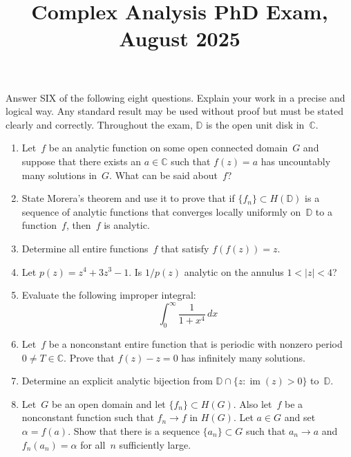 \documentclass[11pt,letterpaper]{article}
\title{Complex Analysis PhD Exam, August 2025}
\author{}
\date{}
\newenvironment{examproblems}[2]{%
  \def\ProblemHeadingTag{#2}%
  \AssignTaggingSocketPlug{block/list/label}{examproblem}%
  \begin{enumerate}%
  \setcounter{enumi}{#1}%
  \renewcommand{\labelenumi}{\textbf{\theenumi.}}%
  \setlength{\topsep}{0.35em}%
  \setlength{\partopsep}{0pt}%
  \setlength{\itemsep}{0.48em}%
  \setlength{\parsep}{0.18em}%
}{\end{enumerate}}
\newenvironment{examinstructions}{%
  \par\begingroup\itshape
}{%
  \par\endgroup\vspace{0.18em}
}
\begin{document}
\maketitle
\thispagestyle{empty}
\begin{examinstructions}
Answer SIX of the following eight questions. Explain your work in a precise and logical way. Any standard result may be used without proof but must be stated clearly and correctly. Throughout the exam, \(\mathbb{D}\) is the open unit disk in~\(\mathbb{C}\).
\end{examinstructions}
\begin{examproblems}{0}{H2}
\def\ProblemHeadingText{Problem 1.}
\item
Let~\(f\) be an analytic function on some open connected domain~\(G\) and suppose that there exists an \(a\in\mathbb{C}\) such that \(f(z)=a\) has uncountably many solutions in~\(G\). What can be said about~\(f\)?
\def\ProblemHeadingText{Problem 2.}
\item
State Morera’s theorem and use it to prove that if \(\{f_n\}\subset H(\mathbb{D})\) is a sequence of analytic functions that converges locally uniformly on~\(\mathbb{D}\) to a function~\(f\), then~\(f\) is analytic.
\def\ProblemHeadingText{Problem 3.}
\item
Determine all entire functions~\(f\) that satisfy \(f(f(z))=z\).
\def\ProblemHeadingText{Problem 4.}
\item
Let \(p(z)=z^4+3z^3-1\). Is \(1/p(z)\) analytic on the annulus \(1<|z|<4\)?
\def\ProblemHeadingText{Problem 5.}
\item
Evaluate the following improper integral:
\[
\int_0^\infty \frac{1}{1+x^4}\,dx
\]
\def\ProblemHeadingText{Problem 6.}
\item
Let~\(f\) be a nonconstant entire function that is periodic with nonzero period \(0\ne T\in\mathbb{C}\). Prove that \(f(z)-z=0\) has infinitely many solutions.
\def\ProblemHeadingText{Problem 7.}
\item
Determine an explicit analytic bijection from \(\mathbb{D}\cap\{z:\operatorname{im}(z)>0\}\) to~\(\mathbb{D}\).
\def\ProblemHeadingText{Problem 8.}
\item
Let~\(G\) be an open domain and let \(\{f_n\}\subset H(G)\). Also let~\(f\) be a nonconstant function such that \(f_n\to f\) in \(H(G)\). Let \(a\in G\) and set \(\alpha=f(a)\). Show that there is a sequence \(\{a_n\}\subset G\) such that \(a_n\to a\) and \(f_n(a_n)=\alpha\) for all~\(n\) sufficiently large.
\end{examproblems}
\end{document}
